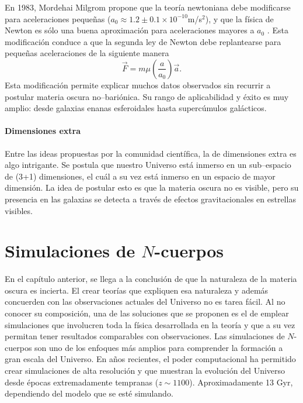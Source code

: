 \documentclass[a4paper,openright,12pt]{book}
\begin{document}
En 1983, Mordehai Milgrom propone que la teoría newtoniana debe modificarse para aceleraciones pequeñas ($a_{0} \approx 1.2 \pm 0.1 \times 10^{-10}$m/s$^{2}$), y que la física de Newton es sólo una buena aproximación para aceleraciones mayores a $a_{0}$ \cite{1.3.8}. Esta modificación conduce a que la segunda ley de Newton debe replantearse para pequeñas aceleraciones de la siguiente manera 
\begin{equation}
\vec{F} = m \mu (\frac{a}{a_{0}})\vec{a}.\label{eqn 1.51}
\end{equation}
Esta modificación permite explicar muchos datos observados sin recurrir a postular materia oscura no--bariónica. Su rango de aplicabilidad y éxito es muy amplio: desde galaxias enanas esferoidales hasta supercúmulos galácticos.

\subsubsection*{Dimensiones extra}

Entre las ideas propuestas por la comunidad científica, la de dimensiones extra es algo intrigante. Se postula que nuestro Universo está inmerso en un sub--espacio de (3+1) dimensiones, el cuál a su vez está inmerso en un espacio de mayor dimensión. La idea de postular esto es que la materia oscura no es visible, pero su presencia en las galaxias se detecta a través de efectos gravitacionales en estrellas visibles.





\chapter{Simulaciones de $N$-cuerpos}\label{cap.nudo}
En el capítulo anterior, se llega a la conclusión de que la naturaleza de la materia oscura es incierta. El crear teorías que expliquen esa naturaleza y además concuerden con las observaciones actuales del Universo no es tarea fácil. Al no conocer su composición, una de las soluciones que se proponen es el de emplear simulaciones que involucren toda la física desarrollada en la teoría y que a su vez permitan tener resultados comparables con observaciones. Las simulaciones de $N$-cuerpos son uno de los enfoques más amplios para comprender la formación a gran escala del Universo. En años recientes, el poder computacional ha permitido crear simulaciones de alta resolución y que muestran la evolución del Universo desde épocas extremadamente tempranas ($z \sim 1100$). Aproximadamente 13 Gyr, dependiendo del modelo que se esté simulando.
\end{document}
